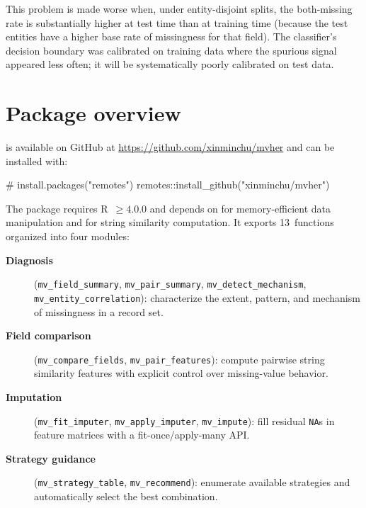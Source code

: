\documentclass[a4paper]{article}
\begin{document}
\begin{article}
This problem is made worse when, under entity-disjoint splits, the
both-missing rate is substantially higher at test time than at training
time (because the test entities have a higher base rate of missingness
for that field). The classifier's decision boundary was calibrated on
training data where the spurious signal appeared less often; it will be
systematically poorly calibrated on test data.

\section{Package overview}
\label{sec:pkg}

 is available on GitHub at
\url{https://github.com/xinminchu/mvher} and can be installed with:

\begin{example}
# install.packages("remotes")
remotes::install_github("xinminchu/mvher")
\end{example}

The package requires R~$\geq 4.0.0$ and depends on
 \citep{datatable} for memory-efficient data
manipulation and  \citep{stringdist} for string
similarity computation.  It exports 13~functions organized into four
modules:

\begin{description}
  \item[\textbf{Diagnosis}] (\texttt{mv\_field\_summary},
    \texttt{mv\_pair\_summary}, \texttt{mv\_detect\_mechanism},
    \texttt{mv\_entity\_correlation}): characterize the extent, pattern,
    and mechanism of missingness in a record set.

  \item[\textbf{Field comparison}] (\texttt{mv\_compare\_fields},
    \texttt{mv\_pair\_features}): compute pairwise string similarity
    features with explicit control over missing-value behavior.

  \item[\textbf{Imputation}] (\texttt{mv\_fit\_imputer},
    \texttt{mv\_apply\_imputer}, \texttt{mv\_impute}): fill residual
    \texttt{NA}s in feature matrices with a fit-once/apply-many API.

  \item[\textbf{Strategy guidance}] (\texttt{mv\_strategy\_table},
    \texttt{mv\_recommend}): enumerate available strategies and
    automatically select the best combination.
\end{description}


\end{article}
\end{document}
